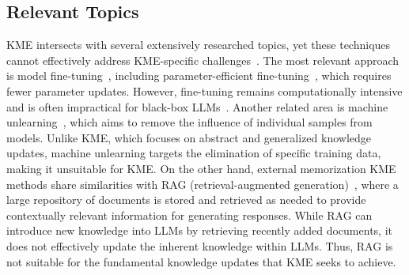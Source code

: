 \documentclass[acmsmall, screen]{acmart}
\begin{document}
\subsection{Relevant Topics}
{KME intersects with several extensively researched topics, yet these techniques cannot effectively address KME-specific challenges~\cite{ alpaca, wei2021finetuned}. The most relevant approach is model fine-tuning~\cite{chung2022scaling, azamfirei2023large, menick2022teaching}, including parameter-efficient fine-tuning~\cite{liu2022few,zaken2022bitfit,wang2022adamix}, which requires fewer parameter updates. However, fine-tuning remains computationally intensive and is often impractical for black-box LLMs~\cite{zhao2023survey, zhang2024comprehensive}. Another related area is machine unlearning~\cite{nguyen2022survey}, which aims to remove the influence of individual samples from models. Unlike KME, which focuses on abstract and generalized knowledge updates, machine unlearning targets the elimination of specific training data, making it unsuitable for KME. On the other hand, external memorization KME methods share similarities with RAG (retrieval-augmented generation)~\cite{gao2023retrieval}, where a large repository of documents is stored and retrieved as needed to provide contextually relevant information for generating responses. While RAG can introduce new knowledge into LLMs by retrieving recently added documents, it does not effectively update the inherent knowledge within LLMs. Thus, RAG is not suitable for the fundamental knowledge updates that KME seeks to achieve.
}
\end{document}
